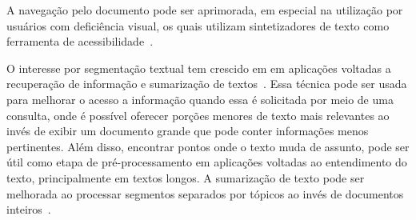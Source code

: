 
A navegação pelo documento pode ser aprimorada, em especial na utilização por usuários com deficiência visual, os quais utilizam  sintetizadores de texto como ferramenta de acessibilidade~\cite{Choi2000}. 








O interesse por segmentação textual tem crescido em em aplicações voltadas a recuperação de informação %
e sumarização de textos~\cite{Maziero2016}. %
Essa técnica pode ser usada para melhorar o acesso a informação quando essa é solicitada por meio de uma consulta, onde é possível oferecer porções menores de texto mais relevantes ao invés de exibir um documento grande que pode conter informações menos pertinentes.  Além disso, encontrar pontos onde o texto muda de assunto, pode ser útil como etapa de pré-processamento em aplicações voltadas ao entendimento do texto, principalmente em textos longos. 
A sumarização de texto pode ser melhorada ao processar segmentos separados por tópicos ao invés de documentos inteiros~\cite{Bhatia2016, Maziero2016, Bokaei2016}. 










